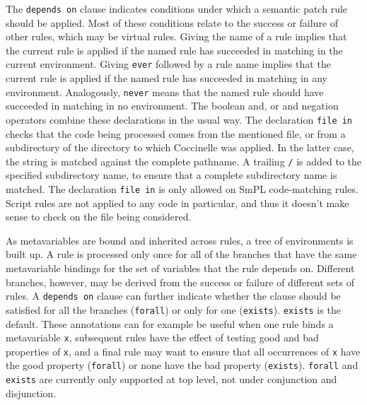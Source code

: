 The \texttt{depends on} clause indicates conditions under which a semantic
patch rule should be applied.  Most of these conditions relate to the
success or failure of other rules, which may be virtual rules.  Giving the
name of a rule implies that the current rule is applied if the named rule
has succeeded in matching in the current environment.  Giving \texttt{ever}
followed by a rule name implies that the current rule is applied if the
named rule has succeeded in matching in any environment.  Analogously,
\texttt{never} means that the named rule should have succeeded in matching
in no environment.  The boolean and, or and negation operators combine
these declarations in the usual way.  The declaration {\tt file in} checks
that the code being processed comes from the mentioned file, or from a
subdirectory of the directory to which Coccinelle was applied.  In the
latter case, the string is matched against the complete pathname.  A
trailing {\tt /} is added to the specified subdirectory name, to ensure
that a complete subdirectory name is matched.  The
declaration {\tt file in} is only allowed on SmPL code-matching rules.
Script rules are not applied to any code in particular, and thus it doesn't
make sense to check on the file being considered.

As metavariables are bound and inherited across rules, a tree of
environments is built up.  A rule is processed only once for all of the
branches that have the same metavariable bindings for the set of variables
that the rule depends on.  Different branches, however, may be derived from
the success or failure of different sets of rules.  A \texttt{depends on}
clause can further indicate whether the clause should be satisfied for all
the branches (\texttt{forall}) or only for one (\texttt{exists}).
\texttt{exists} is the default.  These annotations can for example be
useful when one rule binds a metavariable \texttt{x}, subsequent rules have
the effect of testing good and bad properties of \texttt{x}, and a final
rule may want to ensure that all occurrences of \texttt{x} have the good
property (\texttt{forall}) or none have the bad property
(\texttt{exists}).  \texttt{forall} and \texttt{exists} are currently only
supported at top level, not under conjunction and disjunction.


